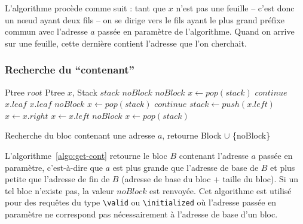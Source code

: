 L'algorithme procède comme suit : tant que $x$ n'est pas une feuille -- c'est
donc un n\oe{}ud ayant deux fils -- on se dirige vers le fils ayant le plus
grand préfixe commun avec l'adresse $a$ passée en paramètre de l'algorithme.
Quand on arrive sur une feuille, cette dernière contient l'adresse que l'on
cherchait.


\subsubsection*{Recherche du ``contenant''}


\begin{algorithm}[h!]
\begin{algorithmic}[1]
\Statex Ptree $root$
\Statex
{}
\Statex Ptree $x$, Stack $stack$
  \Return $noBlock$
\Else
          \Return $noBlock$
        \Else
          \State $x \gets \mathit{pop(stack)}$
          \State $\mathit{continue}$
        \EndIf
        \Return $\mathit{x.leaf}$
        \Return $\mathit{x.leaf}$
        \Return $noBlock$
      \Else
        \State $x \gets \mathit{pop(stack)}$
        \State $\mathit{continue}$
      \EndIf
    \EndIf
      \State $\mathit{stack} \gets \mathit{push(x.left)}$
      \State $x \gets \mathit{x.right}$
      \State $x \gets \mathit{x.left}$
      \Return $noBlock$
    \Else
      \State $x \gets \mathit{pop(stack)}$
    \EndIf
  \EndWhile
\EndIf
\EndFunction
\end{algorithmic}
\caption{Recherche du bloc contenant une adresse $a$, retourne Block $\cup$
  \{noBlock\}
  \label{algo:get-cont}}
\end{algorithm}

L'algorithme~\ref{algo:get-cont} retourne le bloc $B$ contenant
l'adresse $a$ passée en paramètre, c'est-à-dire que $a$ est plus grande que
l'adresse de base de $B$ et plus petite que l'adresse de fin de $B$ (adresse
de base du bloc + taille du bloc).
Si un tel bloc n'existe pas, la valeur $noBlock$ est renvoyée.
Cet algorithme est utilisé pour des requêtes du type \lstinline{\valid} ou
\lstinline{\initialized} où l'adresse passée en paramètre ne correspond pas
nécessairement à l'adresse de base d'un bloc.

